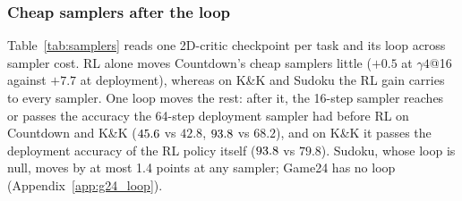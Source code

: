 
\iffalse
\subsubsection{Cheap samplers after the loop}
\label{app:samplers}
Table~\ref{tab:samplers} reads one 2D-critic checkpoint per task and its loop across sampler cost. RL alone moves Countdown's cheap samplers little ($+0.5$ at $\gamma4$@16 against $+7.7$ at deployment), whereas on K\&K and Sudoku the RL gain carries to every sampler. One loop moves the rest: after it, the 16-step sampler reaches or passes the accuracy the 64-step deployment sampler had before RL on Countdown and K\&K ($45.6$ vs $42.8$, $93.8$ vs $68.2$), and on K\&K it passes the deployment accuracy of the RL policy itself ($93.8$ vs $79.8$). Sudoku, whose loop is null, moves by at most 1.4 points at any sampler; Game24 has no loop (Appendix~\ref{app:g24_loop}).


